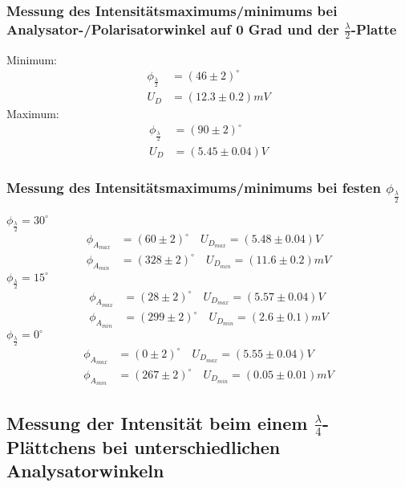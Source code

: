 \documentclass[a4paper]{article}
\begin{document}
\subsubsection{Messung des Intensitätsmaximums/minimums bei Analysator-/Polarisatorwinkel auf 0 Grad und der $\frac{\lambda}{2}$-Platte}
Minimum:
\begin{align}
\phi_{\frac{\lambda}{2}}&=(46 \pm 2)^\circ\\
U_D &= (12.3 \pm 0.2)mV
\end{align}
Maximum:
\begin{align}
\phi_{\frac{\lambda}{2}}&=(90\pm2)^\circ\\
U_D &= (5.45 \pm 0.04)V
\end{align}
\subsubsection{Messung des Intensitätsmaximums/minimums bei festen $\phi_{\frac{\lambda}{2}}$}
$\phi_{\frac{\lambda}{2}}= 30^\circ$
\begin{align}
\phi_{A_{max}}&=(60\pm 2)^\circ \quad U_{D_{max}}=(5.48\pm0.04)V  \\
\phi_{A_{min}}&=(328\pm 2)^\circ \quad U_{D_{min}}=(11.6\pm0.2)mV  
\end{align}
$\phi_{\frac{\lambda}{2}}= 15^\circ$
\begin{align}
\phi_{A_{max}}&=(28 \pm 2)^\circ \quad U_{D_{max}}=(5.57\pm0.04)V \\ 
\phi_{A_{min}}&=(299 \pm 2)^\circ \quad U_{D_{min}}=(2.6\pm 0.1)mV  
\end{align}
$\phi_{\frac{\lambda}{2}}= 0^\circ$
\begin{align}
\phi_{A_{max}}&=(0\pm2)^\circ \quad U_{D_{max}}=(5.55 \pm 0.04)V  \\
\phi_{A_{min}}&=(267\pm 2)^\circ \quad U_{D_{min}}=(0.05 \pm 0.01)mV  
\end{align}
\newpage

\subsection{Messung der Intensität beim einem $\frac{\lambda}{4}$-Plättchens bei unterschiedlichen Analysatorwinkeln}
\end{document}
